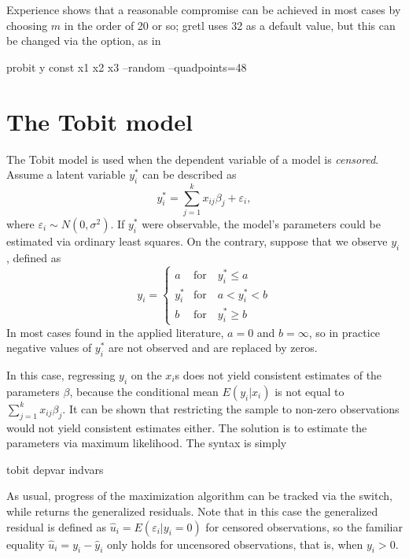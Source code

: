 Experience shows that a reasonable compromise can be achieved in most
cases by choosing $m$ in the order of 20 or so; gretl uses 32 as
a default value, but this can be changed via the 
option, as in
\begin{code}
  probit y const x1 x2 x3 --random --quadpoints=48
\end{code}

 
\section{The Tobit model}
\label{sec:tobit}

The Tobit model is used when the dependent variable of a model is
\emph{censored}. Assume a latent variable $y^*_i$ can be described
as
\[
  y^*_i = \sum_{j=1}^k x_{ij} \beta_j + \varepsilon_i ,
\]
where $\varepsilon_i \sim N(0,\sigma^2)$. If $y^*_i$ were observable,
the model's parameters could be estimated via ordinary least squares.
On the contrary, suppose that we observe $y_i$, defined as
%
\begin{equation}
  \label{eq:tobit}
  y_i = \left\{ 
    \begin{array}{ll}
      a & \mathrm{for} \quad y^*_i \le a \\
      y^*_i & \mathrm{for} \quad a < y^*_i < b \\ 
      b & \mathrm{for} \quad y^*_i \ge b 
    \end{array}
    \right. 
\end{equation}
In most cases found in the applied literature, $a=0$ and $b=\infty$,
so in practice negative values of $y^*_i$ are not observed and are
replaced by zeros.

In this case, regressing $y_i$ on the $x_i$s does not yield consistent
estimates of the parameters $\beta$, because the conditional mean
$E(y_i|x_i)$ is not equal to $\sum_{j=1}^k x_{ij} \beta_j$.  It can be
shown that restricting the sample to non-zero observations would not
yield consistent estimates either. The solution is to estimate the
parameters via maximum likelihood. The syntax is simply
\begin{code}
tobit depvar indvars
\end{code}

As usual, progress of the maximization algorithm can be tracked via
the  switch, while  returns the
generalized residuals. Note that in this case the generalized residual
is defined as $\hat{u}_i = E(\varepsilon_i | y_i = 0)$ for censored
observations, so the familiar equality $\hat{u}_i = y_i - \hat{y}_i$
only holds for uncensored observations, that is, when $y_i>0$.

